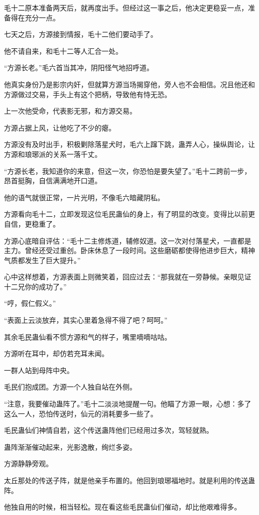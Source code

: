 \begin{this_body}
毛十二原本准备两天后，就再度出手。但经过这一事之后，他决定更稳妥一点，准备得在充分一点。

七天之后，方源接到情报，毛十二他们要动手了。

他不请自来，和毛十二等人汇合一处。

“方源长老。”毛六首当其冲，阴阳怪气地招呼道。

他真实身份乃是影宗内奸，但就算方源当场揭穿他，旁人也不会相信。况且他还和方源做过交易，手头上有这个把柄，导致他有恃无恐。

上一次他受命，代表影无邪，和方源交易。

方源占据上风，让他吃了不少的瘪。

方源没有及时出手，积极剿除落星犬时，毛六上蹿下跳，蛊弄人心，操纵舆论，让方源和琅琊派的关系一落千丈。

“方源长老，我知道你的来意，但这一次，你恐怕是要失望了。”毛十二跨前一步，昂首挺胸，自信满满地开口道。

他的语气就很正常，一片光明，不像毛六暗藏阴私。

方源看向毛十二，立即发现这位毛民蛊仙的身上，有了明显的改变。变得比以前更自信，更稳重了。

方源心底暗自评估：“毛十二主修炼道，辅修奴道。这一次对付落星犬，一直都是主力。曾经还受过重创。卧床休息了一段时间。这些磨砺都使得他进步巨大，精神气质都发生了巨大提升。”

心中这样想着，方源表面上则微笑着，回应过去：“那我就在一旁静候。亲眼见证十二兄你的成功了。”

“哼，假仁假义。”

“表面上云淡放弃，其实心里着急得不得了吧？呵呵。”

其余毛民蛊仙看不惯方源和气的样子，嘴里嘀嘀咕咕。

方源听在耳中，却仿若充耳未闻。

一群人站到母阵中央。

毛民们抱成团。方源一个人独自站在外侧。

“注意，我要催动蛊阵了。”毛十二淡淡地提醒一句。他瞄了方源一眼，心想：多了这么一人，恐怕传送时，仙元的消耗要多一些了。

毛民蛊仙们神情自若，这个传送蛊阵他们已经用过多次，驾轻就熟。

蛊阵渐渐催动起来，光影逸散，绚烂多姿。

方源静静旁观。

太丘那处的传送子阵，就是他亲手布置的。他回到琅琊福地时。就是利用的传送蛊阵。

他独自用的时候，相当轻松。现在看这些毛民蛊仙们催动，却比他艰难得多。


\end{this_body}

